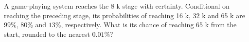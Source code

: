 A game-playing system reaches the 8 k stage with certainty. Conditional on reaching the preceding stage, its probabilities of reaching 16 k, 32 k and 65 k are $99\%$, $80\%$ and $13\%$, respectively. What is its chance of reaching 65 k from the start, rounded to the nearest $0.01\%$?
